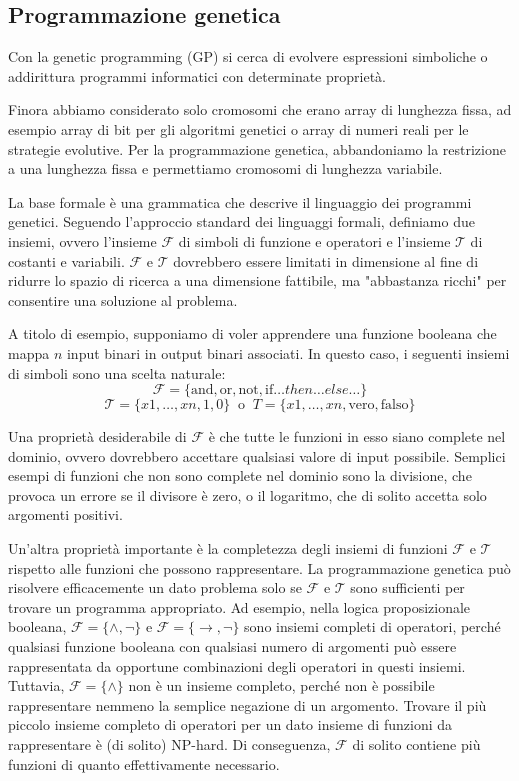 \subsection{Programmazione genetica}
Con la genetic programming (GP) si cerca di evolvere espressioni simboliche o addirittura programmi informatici con determinate proprietà.

Finora abbiamo considerato solo cromosomi che erano array di lunghezza fissa, ad esempio array di bit per gli algoritmi genetici o array di numeri reali per le strategie evolutive. Per la programmazione genetica, abbandoniamo la restrizione a una lunghezza fissa e permettiamo cromosomi di lunghezza variabile.

La base formale è una grammatica che descrive il linguaggio dei programmi genetici. Seguendo l'approccio standard dei linguaggi formali, definiamo due insiemi, ovvero l'insieme $\mathcal{F}$ di simboli di funzione e operatori e l'insieme $\mathcal{T}$ di costanti e variabili. $\mathcal{F}$ e $\mathcal{T}$ dovrebbero essere limitati in dimensione al fine di ridurre lo spazio di ricerca a una dimensione fattibile, ma "abbastanza ricchi" per consentire una soluzione al problema.

A titolo di esempio, supponiamo di voler apprendere una funzione booleana che mappa $n$ input binari in output binari associati. In questo caso, i seguenti insiemi di simboli sono una scelta naturale:
$$\mathcal{F} = \{\text{and}, \text{or}, \text{not}, \text{if} \dots then \dots else \dots\}$$
$$\mathcal{T} = \{x1, \dots, xn, 1, 0\}\;\; \text{o}\;\; T = \{x1, \dots, xn, \text{vero}, \text{falso}\}$$

Una proprietà desiderabile di $\mathcal{F}$ è che tutte le funzioni in esso siano complete nel dominio, ovvero dovrebbero accettare qualsiasi valore di input possibile. Semplici esempi di funzioni che non sono complete nel dominio sono la divisione, che provoca un errore se il divisore è zero, o il logaritmo, che di solito accetta solo argomenti positivi.

Un'altra proprietà importante è la completezza degli insiemi di funzioni $\mathcal{F}$ e $\mathcal{T}$ rispetto alle funzioni che possono rappresentare. La programmazione genetica può risolvere efficacemente un dato problema solo se $\mathcal{F}$ e $\mathcal{T}$ sono sufficienti per trovare un programma appropriato. Ad esempio, nella logica proposizionale booleana, $\mathcal{F} = \{\land, \lnot\}$ e $\mathcal{F} = \{\rightarrow, \lnot\}$ sono insiemi completi di operatori, perché qualsiasi funzione booleana con qualsiasi numero di argomenti può essere rappresentata da opportune combinazioni degli operatori in questi insiemi. Tuttavia, $\mathcal{F} = \{\land\}$ non è un insieme completo, perché non è possibile rappresentare nemmeno la semplice negazione di un argomento. Trovare il più piccolo insieme completo di operatori per un dato insieme di funzioni da rappresentare è (di solito) NP-hard. Di conseguenza, $\mathcal{F}$ di solito contiene più funzioni di quanto effettivamente necessario.

